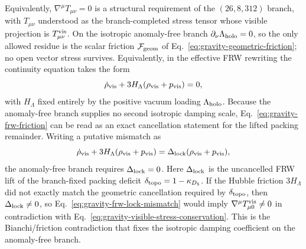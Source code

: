 \documentclass[11pt]{article}
\begin{document}
Equivalently, $\nabla^{\mu}T_{\mu\nu}=0$ is a structural requirement of the
$(26,8,312)$ branch, with $T_{\mu\nu}$ understood as the branch-completed
stress tensor whose visible projection is $T^{\rm vis}_{\mu\nu}$.
On the isotropic anomaly-free branch $\partial_{\nu}\Lambda_{\rm holo}=0$, so
the only allowed residue is the scalar friction $\mathcal F_{\rm geom}$ of
Eq.~\eqref{eq:gravity-geometric-friction}; no open vector stress survives.
Equivalently, in the effective FRW rewriting the continuity equation takes the
form
\begin{equation}
\label{eq:gravity-frw-friction}
 \dot\rho_{\rm vis}+3H_{\Lambda}(\rho_{\rm vis}+p_{\rm vis})=0,
\end{equation}
with $H_{\Lambda}$ fixed entirely by the positive vacuum loading
$\Lambda_{\rm holo}$. Because the anomaly-free branch supplies no second
isotropic damping scale, Eq.~\eqref{eq:gravity-frw-friction} can be read as an
exact cancellation statement for the lifted packing remainder. Writing a
putative mismatch as
\begin{equation}
\label{eq:gravity-frw-lock-mismatch}
 \dot\rho_{\rm vis}+3H_{\Lambda}(\rho_{\rm vis}+p_{\rm vis})
 =
 \Delta_{\rm lock}(\rho_{\rm vis}+p_{\rm vis}),
\end{equation}
the anomaly-free branch requires $\Delta_{\rm lock}=0$. Here
$\Delta_{\rm lock}$ is the uncancelled FRW lift of the branch-fixed packing
deficit $\delta_{\rm topo}=1-\kappa_{D_5}$. If the Hubble friction
$3H_{\Lambda}$ did not exactly match the geometric cancellation required by
$\delta_{\rm topo}$, then $\Delta_{\rm lock}\neq0$, so
Eq.~\eqref{eq:gravity-frw-lock-mismatch} would imply
$\nabla^{\mu}T^{\rm vis}_{\mu 0}\neq0$ in contradiction with
Eq.~\eqref{eq:gravity-visible-stress-conservation}. This is the
Bianchi/friction contradiction that fixes the isotropic damping coefficient on
the anomaly-free branch.
\end{document}
